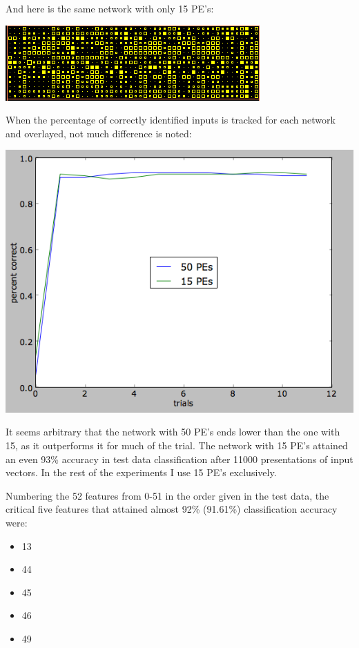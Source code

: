 \documentclass[12pt]{article}
\begin{document}
And here is the same network with only 15 PE's:

\begin{center}
\includegraphics[scale=0.9]{52f15kweights.png}
\end{center}

When the percentage of correctly identified inputs is tracked for each network and overlayed, not much difference is noted:

\begin{center}
\includegraphics[scale=0.7]{52features.png}
\end{center}

It seems arbitrary that the network with 50 PE's ends lower than the one with 15, as it outperforms it for much of the trial.  The network with 15 PE's attained an even 93\% accuracy in test data classification after 11000 presentations of input vectors.  In the rest of the experiments I use 15 PE's exclusively.

Numbering the 52 features from 0-51 in the order given in the test data, the critical five features that attained almost 92\% (91.61\%) classification accuracy were:

\begin{itemize}
\item 13
\item 44
\item 45
\item 46
\item 49
\end{itemize}
\end{document}
